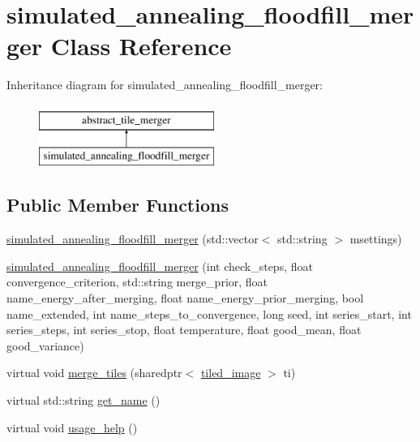 \hypertarget{classsimulated__annealing__floodfill__merger}{\section{simulated\-\_\-annealing\-\_\-floodfill\-\_\-merger Class Reference}
\label{classsimulated__annealing__floodfill__merger}
}
Inheritance diagram for simulated\-\_\-annealing\-\_\-floodfill\-\_\-merger\-:\begin{figure}[H]
\begin{center}
\leavevmode
\includegraphics[height=2.000000cm]{classsimulated__annealing__floodfill__merger}
\end{center}
\end{figure}
\subsection*{Public Member Functions}
\begin{DoxyCompactItemize}
\item 
\hyperlink{classsimulated__annealing__floodfill__merger_a55d824fc05eb37d45888ecc2e2439250}{simulated\-\_\-annealing\-\_\-floodfill\-\_\-merger} (std\-::vector$<$ std\-::string $>$ msettings)
\item 
\hyperlink{classsimulated__annealing__floodfill__merger_a6ed9571eaf0051f48c9502d00f334802}{simulated\-\_\-annealing\-\_\-floodfill\-\_\-merger} (int check\-\_\-steps, float convergence\-\_\-criterion, std\-::string merge\-\_\-prior, float name\-\_\-energy\-\_\-after\-\_\-merging, float name\-\_\-energy\-\_\-prior\-\_\-merging, bool name\-\_\-extended, int name\-\_\-steps\-\_\-to\-\_\-convergence, long seed, int series\-\_\-start, int series\-\_\-steps, int series\-\_\-stop, float temperature, float good\-\_\-mean, float good\-\_\-variance)
\item 
virtual void \hyperlink{classsimulated__annealing__floodfill__merger_a4d15f1b8e98b0aa96bbb8b97f73b7ecc}{merge\-\_\-tiles} (sharedptr$<$ \hyperlink{classtiled__image}{tiled\-\_\-image} $>$ ti)
\item 
virtual std\-::string \hyperlink{classsimulated__annealing__floodfill__merger_a1e235b700efd2ccdcf771cd93251a1b9}{get\-\_\-name} ()
\item 
virtual void \hyperlink{classsimulated__annealing__floodfill__merger_a6470774a227b289d5e16beac41e163d2}{usage\-\_\-help} ()
\end{DoxyCompactItemize}


